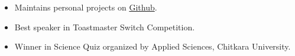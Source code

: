 \vspace{-0.2cm}


{\fontsize{11pt}{1em}\bodyfontlight\upshape\color{text}
\begin{itemize}
  \itemsep-0.3em
  \item Maintains personal projects on \href{https://github.com/thakursaurabh1998}{Github}.
  \item Best speaker in Toastmaster Switch Competition.
  \item Winner in Science Quiz organized by Applied Sciences, Chitkara University.
\end{itemize}
}

